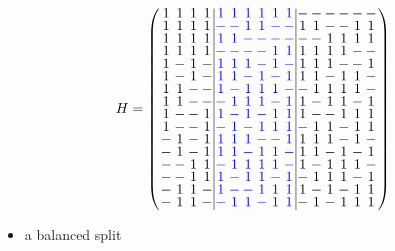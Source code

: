 \documentclass{beamer}
\newcommand{\bblue}[1]{\textcolor{blue}{#1}}
\begin{document}
\begin{frame}

   \[
     H=
    \arraycolsep=1.0pt\def\arraystretch{0.75}
    \left(\begin{array}{cccc|cccccc|cccccc}
            1&1&1&1&\bblue{1}&\bblue{1}&\bblue{1}&\bblue{1}&\bblue{1}&\bblue{1}&-&-&-&-&-&-\\
            1&1&1&1&\bblue{-}&\bblue{-}&\bblue{1}&\bblue{1}&\bblue{-}&\bblue{-}&1&1&-&-&1&1\\
            1&1&1&1&\bblue{1}&\bblue{1}&\bblue{-}&\bblue{-}&\bblue{-}&\bblue{-}&-&-&1&1&1&1\\
            1&1&1&1&\bblue{-}&\bblue{-}&\bblue{-}&\bblue{-}&\bblue{1}&\bblue{1}&1&1&1&1&-&-\\
            1&-&1&-&\bblue{1}&\bblue{1}&\bblue{1}&\bblue{-}&\bblue{1}&\bblue{-}&1&1&1&-&-&1\\
            1&-&1&-&\bblue{1}&\bblue{1}&\bblue{-}&\bblue{1}&\bblue{-}&\bblue{1}&1&1&-&1&1&-\\
            1&1&-&-&\bblue{1}&\bblue{-}&\bblue{1}&\bblue{1}&\bblue{1}&\bblue{-}&-&1&1&1&1&-\\
            1&1&-&-&\bblue{-}&\bblue{1}&\bblue{1}&\bblue{1}&\bblue{-}&\bblue{1}&1&-&1&1&-&1\\
            1&-&-&1&\bblue{1}&\bblue{-}&\bblue{1}&\bblue{-}&\bblue{1}&\bblue{1}&1&-&-&1&1&1\\
            1&-&-&1&\bblue{-}&\bblue{1}&\bblue{-}&\bblue{1}&\bblue{1}&\bblue{1}&-&1&1&-&1&1\\
            -&1&-&1&\bblue{1}&\bblue{1}&\bblue{1}&\bblue{-}&\bblue{-}&\bblue{1}&1&1&1&-&1&-\\
            -&1&-&1&\bblue{1}&\bblue{1}&\bblue{-}&\bblue{1}&\bblue{1}&\bblue{-}&1&1&-&1&-&1\\
            -&-&1&1&\bblue{-}&\bblue{1}&\bblue{1}&\bblue{1}&\bblue{1}&\bblue{-}&1&-&1&1&1&-\\
            -&-&1&1&\bblue{1}&\bblue{-}&\bblue{1}&\bblue{1}&\bblue{-}&\bblue{1}&-&1&1&1&-&1\\
            -&1&1&-&\bblue{1}&\bblue{-}&\bblue{-}&\bblue{1}&\bblue{1}&\bblue{1}&1&-&1&-&1&1\\
            -&1&1&-&\bblue{-}&\bblue{1}&\bblue{1}&\bblue{-}&\bblue{1}&\bblue{1}&-&1&-&1&1&1\\
          \end{array}\right)
      \]

      \begin{itemize}
      \item a balanced split
      \end{itemize}
 
\end{frame}
\end{document}
